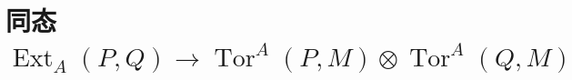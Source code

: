 \section{同态 \texorpdfstring{$\operatorname{Ext}_{A}(P,Q)\to\operatorname{Tor}^{A}(P,M)\otimes\operatorname{Tor}^{A}(Q,M)$}{ExtA(P,Q)->TorA(P,M)@TorA(Q,M)}}
